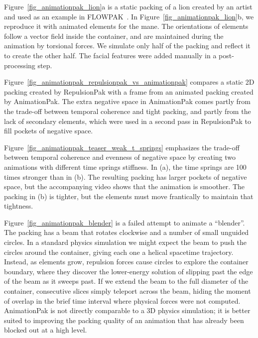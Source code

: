 
Figure~\ref{fig_animationpak_lion}a is a static packing of a lion created by an artist and
used as an example in FLOWPAK~\cite{Saputra2017}.  In Figure~\ref{fig_animationpak_lion}b,
we reproduce it with animated elements for the mane.
The orientations of elements follow a vector field inside
the container, and are maintained during the animation by 
torsional forces.
We simulate only half of the packing and reflect it to create the other half.
The facial features were added manually in a post-processing step.

Figure~\ref{fig_animationpak_repulsionpak_vs_animationpak} compares
a static 2D packing created by RepulsionPak with a frame
from an animated packing created by AnimationPak.
The extra negative space in AnimationPak comes partly from the trade-off
between temporal coherence and tight packing, and partly from the lack
of secondary elements, which were used in a second pass in RepulsionPak 
to fill pockets of negative space.

Figure~\ref{fig_animationpak_teaser_weak_t_springs} emphasizes the trade-off between
temporal coherence and evenness of negative space by creating two animations
with different time springs stiffness.  In (a), the time springs
are 100 times stronger than in (b).  The resulting packing has larger
pockets of negative space, but the accompanying video shows that the
animation is smoother.  The packing in (b) is tighter, but the elements
must move frantically to maintain that tightness.


Figure~\ref{fig_animationpak_blender} is a failed attempt to animate a ``blender''.
The packing has a beam that rotates clockwise
and a number of small unguided circles.  
In a standard physics simulation we might expect the beam to push the 
circles around the container, giving each one a helical spacetime 
trajectory.
Instead, as elements grow, repulsion forces cause circles to explore the 
container boundary, where they discover the lower-energy solution of 
slipping past the edge of the beam as it sweeps past.
If we extend the beam to the full diameter of the container,
consecutive slices simply teleport across the beam, hiding the moment of
overlap in the brief time interval where physical forces were not computed.
AnimationPak is not directly comparable to a
3D physics simulation; it is better suited to improving the
packing quality of an animation that has already been blocked out at a 
high level.

